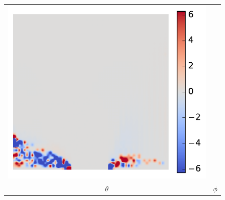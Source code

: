 \documentclass[11pt]{article}
\begin{document}
\begin{figure}[!h]
\begin{tabular}{cc}
         \includegraphics[scale=.5]{img/asymmetricFluxRobust/phi.pdf}
         \\
         $\theta $ & $\phi$ 
    \end{tabular}
\end{figure}
\pagebreak
\end{document}
